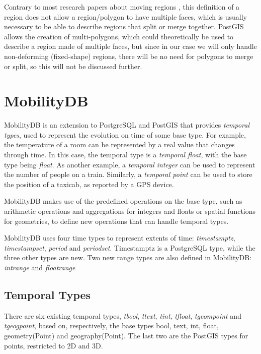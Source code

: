 Contrary to most research papers about moving regions \cite{polyhedra,model_structure_for_mod,moving_obj_foundation}, this definition of a region does not allow a region/polygon to have multiple faces, which is usually necessary to be able to describe regions that split or merge together. PostGIS allows the creation of multi-polygons, which could theoretically be used to describe a region made of multiple faces, but since in our case we will only handle non-deforming (fixed-shape) regions, there will be no need for polygons to merge or split, so this will not be discussed further.

\section{MobilityDB}
\label{section:mobilitydb}

MobilityDB \cite{mobilitydb} is an extension to PostgreSQL and PostGIS that provides \textit{temporal types}, used to represent the evolution on time of some base type. For example, the temperature of a room can be represented by a real value that changes through time. In this case, the temporal type is a \textit{temporal float}, with the base type being \textit{float}. As another example, a \textit{temporal integer} can be used to represent the number of people on a train. Similarly, a \textit{temporal point} can be used to store the position of a taxicab, as reported by a GPS device.

MobilityDB makes use of the predefined operations on the base type, such as arithmetic operations and aggregations for integers and floats or spatial functions for geometries, to define new operations that can handle temporal types.

MobilityDB uses four time types to represent extents of time: \textit{timestamptz}, \textit{timestampset}, \textit{period} and \textit{periodset}. Timestamptz is a PostgreSQL type, while the three other types are new. Two new range types are also defined in MobilityDB: \textit{intrange} and \textit{floatrange}

\subsection{Temporal Types}
\label{section:mobilitydb_ttypes}

There are six existing temporal types, \textit{tbool}, \textit{ttext}, \textit{tint}, \textit{tfloat}, \textit{tgeompoint} and \textit{tgeogpoint}, based on, respectively, the base types bool, text, int, float, geometry(Point) and geography(Point). The last two are the PostGIS types for points, restricted to 2D and 3D.

